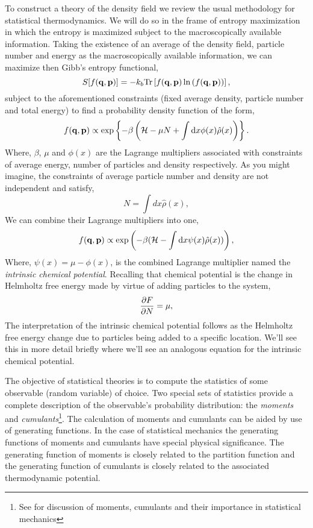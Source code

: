 To construct a theory of the density field we review the usual methodology for
statistical thermodynamics. We will do so in the frame of entropy maximization
in which the entropy is maximized subject to the macroscopically available
information. Taking the existence of an average of the density field, particle
number and energy as the macroscopically available information, we can maximize
then Gibb's entropy functional,
%
\begin{equation}
    S[f(\mathbf{q}, \mathbf{p})] = -k_b \mathrm{Tr}\left[ f(\mathbf{q}, \mathbf{p})\ln\left(f(\mathbf{q}, \mathbf{p})\right) \right], 
\end{equation}
%
subject to the aforementioned constraints (fixed average density, particle
number and total energy) to find a probability density function of the form,
%
\begin{equation} 
    f(\mathbf{q}, \mathbf{p}) \propto \exp\left\lbrace-\beta \left(\mathcal{H} -\mu N + \int \mathrm{d}x
        \phi(x)\hat{\rho}(x)\right)\right\rbrace.
\end{equation}
%
Where, $\beta$, $\mu$ and $\phi(x)$ are the Lagrange multipliers associated
with constraints of average energy, number of particles and density
respectively. As you might imagine, the constraints of average particle number
and density are not independent and satisfy,
%
\begin{equation}
    N = \int dx \hat{\rho}(x),
\end{equation}
%
We can combine their Lagrange multipliers into one,
%
\begin{equation}
    f(\mathbf{q}, \mathbf{p}) \propto \exp\left(- \beta(\mathcal{H} - \int \mathrm{d}x \psi(x)
        \hat{\rho}(x))\right),
\end{equation}
%
Where, $\psi(x) = \mu - \phi(x)$, is the combined Lagrange multiplier named the
\textit{intrinsic chemical potential}. Recalling that chemical potential is the
change in Helmholtz free energy made by virtue of adding particles to the
system,
%
\begin{equation}
    \label{eq:chem_potential} 
    \frac{\partial F}{\partial N} = \mu,
\end{equation}
%
The interpretation of the intrinsic chemical potential follows as the Helmholtz
free energy change due to particles being added to a specific location.  We'll
see this in more detail briefly where we'll see an analogous equation for the
intrinsic chemical potential.

The objective of statistical theories is to compute the statistics of some
observable (random variable) of choice. Two special sets of statistics provide
a complete description of the observable's probability distribution: the
\textit{moments} and \textit{cumulants}\footnote{See \cite{KUBO62} for
discussion of moments, cumulants and their importance in statistical
mechanics}.  The calculation of moments and cumulants can be aided by use of
generating functions. In the case of statistical mechanics the generating
functions of moments and cumulants have special physical significance. The
generating function of moments is closely related to the partition function and
the generating function of cumulants is closely related to the associated
thermodynamic potential. 

